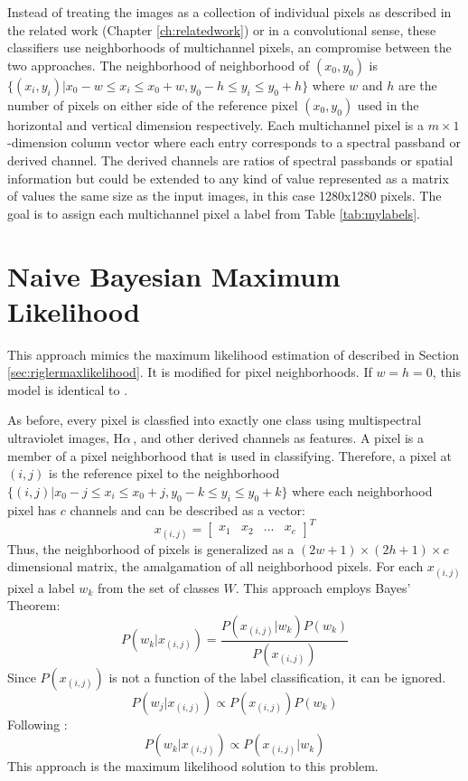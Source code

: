 \documentclass[twoside]{report}
\newcommand{\halpha}{H$\alpha$\,}
\begin{document}
Instead of treating the images as a collection of individual pixels as described in the related work (Chapter \ref{ch:relatedwork}) or in a convolutional sense, these classifiers use neighborhoods of multichannel pixels, an compromise between the two approaches. The neighborhood of neighborhood of $(x_0, y_0)$ is $\{(x_i, y_i) | x_0 - w \le x_i \le x_0 + w, y_0 - h \le y_i \le y_0 + h\}$  where $w$ and $h$ are the number of pixels on either side of the reference pixel $(x_0, y_0)$ used in the horizontal and vertical dimension respectively. Each multichannel pixel is a $m \times 1$-dimension column vector where each entry corresponds to a spectral passband or derived channel. The derived channels are ratios of spectral passbands or spatial information but could be extended to any kind of value represented as a matrix of values the same size as the input images, in this case 1280x1280 pixels. The goal is to assign each multichannel pixel a label from Table \ref{tab:mylabels}. 


\section{Naive Bayesian Maximum Likelihood}

This approach mimics the maximum likelihood estimation of \cite{rigler:2012} described in Section \ref{sec:riglermaxlikelihood}. It is modified for pixel neighborhoods. If $w=h=0$, this model is identical to \cite{rigler:2012}. 

As before, every pixel is classfied into exactly one class using multispectral ultraviolet images, \halpha, and other derived channels as features. A pixel is a member of a pixel neighborhood that is used in classifying. Therefore, a pixel at $(i,j)$ is the reference pixel to the neighborhood $\{(i, j) | x_0 - j \le x_i \le x_0 + j, y_0 - k \le y_i \le y_0 + k\}$ where each neighborhood pixel has $c$ channels and can be described as a vector:
\[x_{(i,j)} = \begin{bmatrix} x_1 & x_2 & \hdots & x_c \end{bmatrix}^T \]
Thus, the neighborhood of pixels is generalized as a $(2w + 1) \times (2h + 1) \times c$ dimensional matrix, the amalgamation of all neighborhood pixels. 
For each $x_{(i,j)}$ pixel a label $w_k$ from the set of classes $W$. This approach employs Bayes' Theorem:
\[ P(w_k | x_{(i,j)}) = \frac{P(x_{(i,j)} | w_k) P(w_k)}{P(x_{(i,j)})} \]
Since $P(x_{(i,j)})$ is not a function of the label classification, it can be ignored.
\[ P(w_j | x_{(i,j)}) \propto P(x_{(i,j)}) P(w_{k}) \]
Following \cite{rigler:2012}: 
\[ P(w_k | x_{(i,j)}) \propto P(x_{(i,j)} | w_k) \]
This approach is the maximum likelihood solution to this problem.
\end{document}
